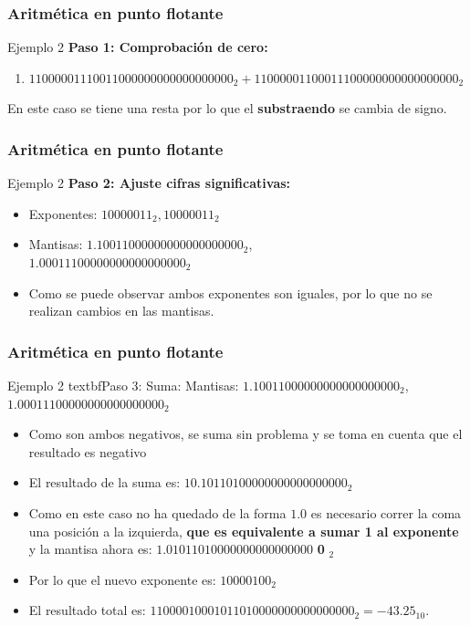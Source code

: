 \documentclass{beamer}
\begin{document}
\begin{frame}
	\frametitle{Aritmética en punto flotante}
	\begin{block}{Ejemplo 2}
	\textbf{Paso 1: Comprobación de cero:}
	\begin{enumerate}
		\item $11000001110011000000000000000000_{2} + 11000001100011100000000000000000_{2}$
	\end{enumerate}	
	En este caso se tiene una resta por lo que el \textbf{substraendo} se cambia de signo.
	\end{block}
\end{frame}


\begin{frame}
	\frametitle{Aritmética en punto flotante}
	\begin{block}{Ejemplo 2}
	\textbf{Paso 2: Ajuste cifras significativas:}
		\begin{itemize}
			\item Exponentes: $10000011_{2}, 10000011_{2}$ 
			\item Mantisas: $1.10011000000000000000000_{2}$,\\$1.00011100000000000000000_{2}$
			\item Como se puede observar ambos exponentes son iguales, por lo que no se realizan cambios en las mantisas.
		\end{itemize}		
	\end{block}
\end{frame}


\begin{frame}
	\frametitle{Aritmética en punto flotante}
	\begin{block}{Ejemplo 2}
	textbf{Paso 3: Suma:}
		Mantisas: $1.10011000000000000000000_{2}$,\\$1.00011100000000000000000_{2}$
		\begin{itemize}
			\item Como son ambos negativos, se suma sin problema y se toma en cuenta que el resultado es negativo
			\item El resultado de la suma es: $10.10110100000000000000000_{2}$
			\item Como en este caso no ha quedado de la forma $1.0$ es necesario correr la coma una posición a la izquierda, \textbf{que es equivalente a sumar 1 al exponente} y la mantisa ahora es: $1.01011010000000000000000$ \textbf{0} $_{2}$
			\item Por lo que el nuevo exponente es: $10000100_{2}$
			\item El resultado total es: $1 10000100 01011010000000000000000_{2} = -43.25_{10}$.
		\end{itemize}		
	\end{block}
\end{frame}
\end{document}
